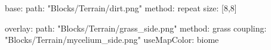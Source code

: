 base:
  path: "Blocks/Terrain/dirt.png"
  method: repeat
  size: [8,8]

overlay:
  path: "Blocks/Terrain/grass_side.png"
  method: grass
  coupling: "Blocks/Terrain/mycelium_side.png"
  useMapColor: biome
